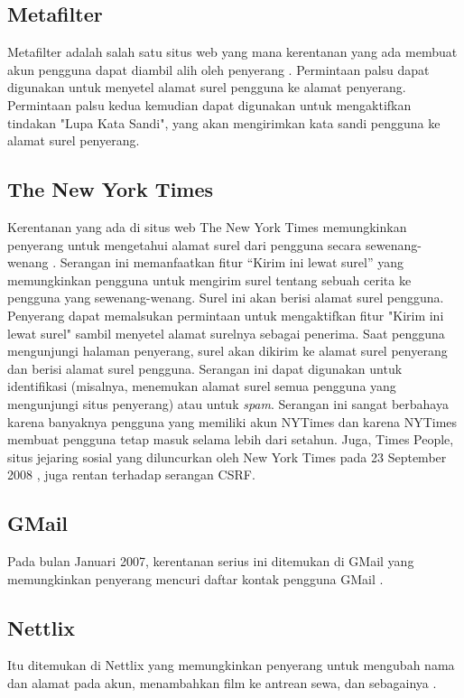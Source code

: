 \documentclass{article}
\begin{document}
\subsection{Metafilter}  
Metafilter adalah salah satu situs web yang mana kerentanan yang ada membuat akun pengguna dapat diambil alih oleh penyerang \cite{zeller2008cross}. Permintaan palsu dapat digunakan untuk menyetel alamat surel pengguna ke alamat penyerang. Permintaan palsu kedua kemudian dapat digunakan untuk mengaktifkan tindakan "Lupa Kata Sandi", yang akan mengirimkan kata sandi pengguna ke alamat surel penyerang. 

\subsection{The New York Times} 
Kerentanan yang ada di situs web The New York Times memungkinkan penyerang untuk mengetahui alamat surel dari pengguna secara sewenang-wenang \cite{zeller2008cross}. Serangan ini memanfaatkan fitur “Kirim ini lewat surel”  yang memungkinkan pengguna untuk mengirim surel tentang sebuah cerita ke pengguna yang sewenang-wenang. Surel ini akan berisi alamat surel pengguna. Penyerang dapat memalsukan permintaan untuk mengaktifkan fitur "Kirim ini lewat surel" sambil menyetel alamat surelnya sebagai penerima. Saat pengguna mengunjungi halaman penyerang, surel akan dikirim ke alamat surel penyerang dan berisi alamat surel pengguna. Serangan ini dapat digunakan untuk identifikasi (misalnya, menemukan alamat surel semua pengguna yang mengunjungi situs penyerang) atau untuk \textit{spam}. Serangan ini sangat berbahaya karena banyaknya pengguna yang memiliki akun NYTimes dan karena NYTimes membuat pengguna tetap masuk selama lebih dari setahun. Juga, Times People, situs jejaring sosial yang diluncurkan oleh New York Times pada 23 September 2008 , juga rentan terhadap serangan CSRF.

\subsection{GMail} 
Pada bulan Januari 2007, kerentanan serius ini ditemukan di GMail yang memungkinkan penyerang mencuri daftar kontak pengguna GMail \cite{siddiqui2011cross}.

\subsection{Nettlix}
Itu ditemukan di Nettlix yang memungkinkan penyerang untuk mengubah nama dan alamat pada akun, menambahkan film ke antrean sewa, dan sebagainya \cite{siddiqui2011cross}.
\end{document}
